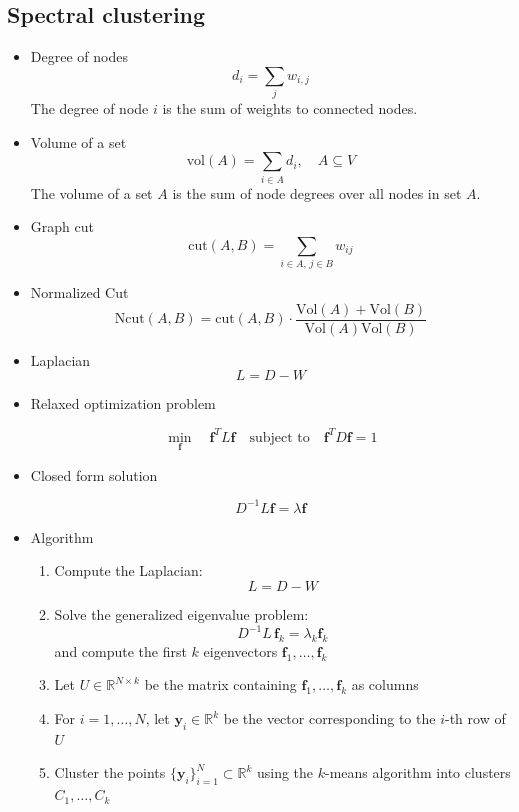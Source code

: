 \documentclass[11pt]{article}
\begin{document}
\subsection{Spectral clustering}
\begin{itemize}
	\item Degree of nodes
	      \[
		      d_i = \sum_j w_{i,j}
	      \]
	      The degree of node \(i\) is the sum of weights to connected nodes.

	\item Volume of a set
	      \[
		      \text{vol}(A) = \sum_{i \in A} d_i, \quad A \subseteq V
	      \]
	      The volume of a set \(A\) is the sum of node degrees over all nodes in set \(A\).
	\item Graph cut
	      \[
		      \text{cut}(A, B) = \sum_{i \in A,\, j \in B} w_{ij}
	      \]
	\item Normalized Cut
	      \[
		      \text{Ncut}(A, B) = \text{cut}(A, B) \cdot \frac{\text{Vol}(A) + \text{Vol}(B)}{\text{Vol}(A)\text{Vol}(B)}
	      \]
	\item Laplacian
	      \[
		      L = D - W
	      \]
	\item Relaxed optimization problem

	      \[
		      \min_{\mathbf{f}} \quad \mathbf{f}^T L \mathbf{f} \quad \text{subject to} \quad \mathbf{f}^T D \mathbf{f} = 1
	      \]

	\item Closed form solution

	      \[
		      D^{-1} L \mathbf{f} = \lambda \mathbf{f}
	      \]

	\item Algorithm

	      \begin{enumerate}
		      \item Compute the Laplacian:
		            \[
			            L = D - W
		            \]

		      \item Solve the generalized eigenvalue problem:
		            \[
			            D^{-1}L \, \mathbf{f}_k = \lambda_k \mathbf{f}_k
		            \]
		            and compute the first \( k \) eigenvectors \( \mathbf{f}_1, \dots, \mathbf{f}_k \)

		      \item Let \( U \in \mathbb{R}^{N \times k} \) be the matrix containing \( \mathbf{f}_1, \dots, \mathbf{f}_k \) as columns

		      \item For \( i = 1, \dots, N \), let \( \mathbf{y}_i \in \mathbb{R}^k \) be the vector corresponding to the \( i \)-th row of \( U \)

		      \item Cluster the points \( \{ \mathbf{y}_i \}_{i=1}^N \subset \mathbb{R}^k \) using the \( k \)-means algorithm into clusters \( C_1, \dots, C_k \)
	      \end{enumerate}
\end{itemize}
\end{document}
